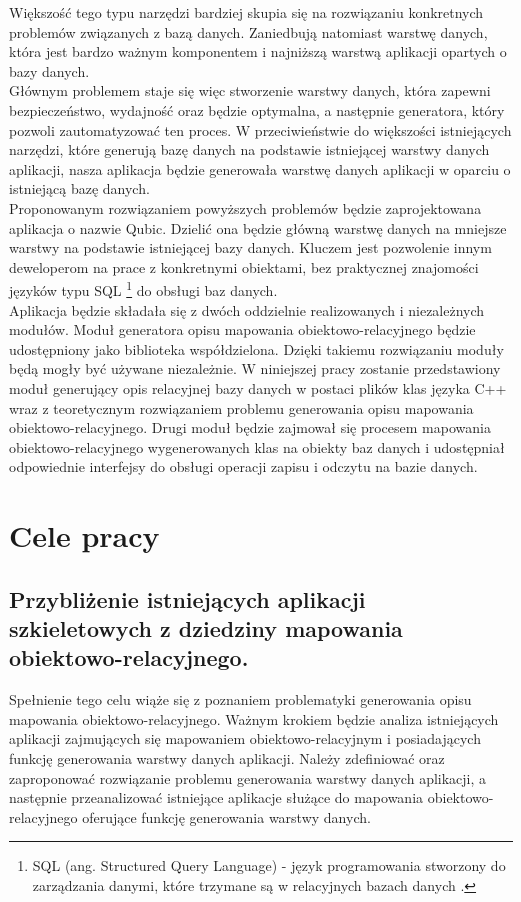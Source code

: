 \documentclass[12pt]{report}
\begin{document}
Większość tego typu narzędzi bardziej skupia się na rozwiązaniu konkretnych problemów związanych z bazą danych. Zaniedbują natomiast warstwę danych,
która jest bardzo ważnym komponentem i najniższą warstwą aplikacji opartych o bazy danych. \\
	\indent Głównym problemem staje się więc stworzenie warstwy danych, która zapewni bezpieczeństwo, wydajność oraz będzie optymalna, a następnie generatora, który pozwoli zautomatyzować ten proces. W przeciwieństwie do większości istniejących narzędzi, które generują bazę danych na podstawie istniejącej warstwy danych aplikacji,
nasza aplikacja będzie generowała warstwę danych aplikacji w oparciu o istniejącą bazę danych. \\
	\indent Proponowanym rozwiązaniem powyższych problemów będzie zaprojektowana aplikacja o nazwie Qubic. Dzielić ona będzie główną warstwę danych
na mniejsze warstwy na podstawie istniejącej bazy danych. Kluczem jest pozwolenie innym deweloperom na prace z konkretnymi obiektami, bez praktycznej znajomości
języków typu SQL
	\footnote{SQL (ang. Structured Query Language) - język programowania stworzony do zarządzania danymi, które trzymane są w relacyjnych bazach danych \cite{sql}.} 
 do obsługi baz danych. \\
	\indent Aplikacja będzie składała się z dwóch oddzielnie realizowanych i niezależnych modułów.
Moduł generatora opisu mapowania obiektowo-relacyjnego będzie udostępniony jako biblioteka współdzielona.
Dzięki takiemu rozwiązaniu moduły będą mogły być używane niezależnie.
W niniejszej pracy zostanie przedstawiony moduł generujący opis 
relacyjnej bazy danych w postaci plików klas języka C++ wraz z teoretycznym rozwiązaniem problemu generowania opisu mapowania obiektowo-relacyjnego.
Drugi moduł będzie zajmował się procesem mapowania 
obiektowo-relacyjnego wygenerowanych klas na obiekty baz danych i udostępniał
odpowiednie interfejsy do obsługi operacji  zapisu i odczytu na bazie danych.

\section{Cele pracy}
\subsection{Przybliżenie istniejących aplikacji szkieletowych z dziedziny mapowania obiektowo-relacyjnego.}
Spełnienie tego celu wiąże się z poznaniem problematyki generowania opisu mapowania obiektowo-relacyjnego. Ważnym krokiem będzie analiza istniejących aplikacji zajmujących się
mapowaniem obiektowo-relacyjnym i posiadających funkcję generowania warstwy danych aplikacji. Należy zdefiniować oraz zaproponować rozwiązanie problemu generowania warstwy danych aplikacji, a następnie przeanalizować istniejące aplikacje służące do mapowania obiektowo-relacyjnego oferujące funkcję generowania warstwy danych.
\end{document}

